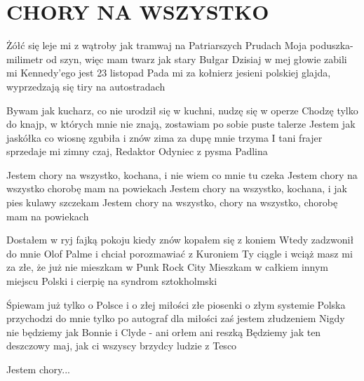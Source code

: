 \documentclass[../../../songbook.tex]{subfiles}
\begin{document}
\TabPositions{11cm} %
\section*{CHORY NA WSZYSTKO}
{}
\vspace{0.5cm}
Żółć się leje mi z wątroby jak tramwaj na Patriarszych Prudach		 \newline
Moja poduszka- milimetr od szyn, więc mam twarz jak stary Bułgar	 \newline
Dzisiaj w mej głowie zabili mi Kennedy'ego jest 23 listopad		 \newline	
Pada mi za kołnierz jesieni polskiej glajda, wyprzedzają się tiry na autostradach	 \newline	

Bywam jak kucharz, co nie urodził się w kuchni, nudzę się w operze		 \newline
Chodzę tylko do knajp, w których mnie nie znają, zostawiam po sobie puste talerze	 \newline
Jestem jak jaskółka co wiosnę zgubiła i znów zima za dupę mnie trzyma \newline
I tani frajer sprzedaje mi zimny czaj, Redaktor Odyniec z pysma Padlina		 \newline

\-\hspace{1cm} Jestem chory na wszystko, kochana, i nie wiem co mnie tu czeka	 \newline
\-\hspace{1cm} Jestem chory na wszystko chorobę mam na powiekach		 \newline
\-\hspace{1cm} Jestem chory na wszystko, kochana, i jak pies kulawy szczekam	 \newline	
\-\hspace{1cm} Jestem chory na wszystko, chory na wszystko, chorobę mam na powiekach	 \newline	

Dostałem w ryj fajką pokoju kiedy znów kopałem się z koniem \newline
Wtedy zadzwonił do mnie Olof Palme i chciał porozmawiać z Kuroniem \newline
Ty ciągle i wciąż masz mi za złe, że już nie mieszkam w Punk Rock City \newline
Mieszkam w całkiem innym miejscu Polski i cierpię na syndrom sztokholmski \newline

Śpiewam już tylko o Polsce i o złej miłości złe piosenki o złym systemie \newline
Polska przychodzi do mnie tylko po autograf dla miłości zaś jestem złudzeniem \newline
Nigdy nie będziemy jak Bonnie i Clyde - ani orłem ani reszką \newline
Będziemy jak ten deszczowy maj, jak ci wszyscy brzydcy ludzie z Tesco \newline

\-\hspace{1cm} Jestem chory...  \newline
\end{document}
